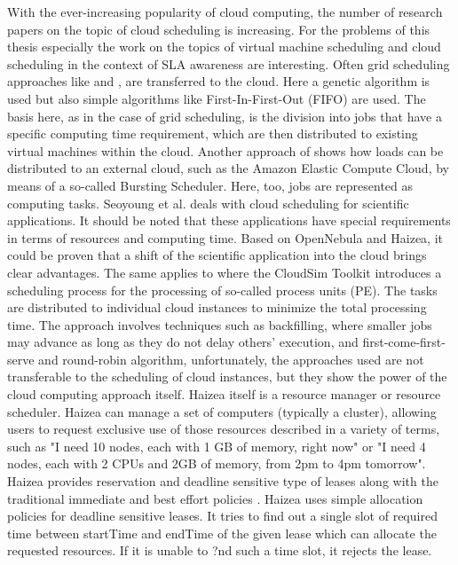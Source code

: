 With the ever-increasing popularity of cloud computing, the number of research papers on the topic of cloud scheduling is increasing. For the problems of this thesis especially the work on the topics of virtual machine scheduling and cloud scheduling in the context of SLA awareness are interesting. Often grid scheduling approaches like \cite{ga-basedtask} and \cite{deadlineawarecloud}, are transferred to the cloud. Here a genetic algorithm is used but also simple algorithms like First-In-First-Out (FIFO) are used. The basis here, as in the case of grid scheduling, is the division into jobs that have a specific computing time requirement, which are then distributed to existing virtual machines within the cloud. Another approach of \cite{cloudbursting} shows how loads can be distributed to an external cloud, such as the Amazon Elastic Compute Cloud, by means of a so-called Bursting Scheduler. Here, too, jobs are represented as computing tasks. Seoyoung et al. \cite{adaptablecloudscheduling} deals with cloud scheduling for scientific applications. It should be noted that these applications have special requirements in terms of resources and computing time. Based on OpenNebula and Haizea\cite{haizea}, it could be proven that a shift of the scientific application into the cloud brings clear advantages. The same applies to \cite{twolevel} where the CloudSim Toolkit introduces a scheduling process for the processing of so-called process units (PE). The tasks are distributed to individual cloud instances to minimize the total processing time. The approach involves techniques such as backfilling, where smaller jobs may advance as long as they do not delay others' execution, and first-come-first-serve and round-robin algorithm, unfortunately, the approaches used are not transferable to the scheduling of cloud instances, but they show the power of the cloud computing approach itself. Haizea \cite{haizea2} itself is a resource manager or resource scheduler. Haizea  can manage a set of computers (typically a cluster), allowing users to request exclusive use of those resources described in a variety of terms, such as "I need 10 nodes, each with 1 GB of memory, right now" or "I need 4 nodes, each with 2 CPUs and 2GB of memory, from 2pm to 4pm tomorrow". Haizea provides reservation and deadline sensitive type of leases along with the traditional immediate and best effort policies \cite{haizea1} \cite{haizea3} \cite{haizea4}. Haizea uses simple allocation policies for deadline sensitive leases. It tries to find out a single slot of required time between startTime and endTime of the given lease which can allocate the requested resources. If it is unable to ?nd such a time slot, it rejects the lease. 


